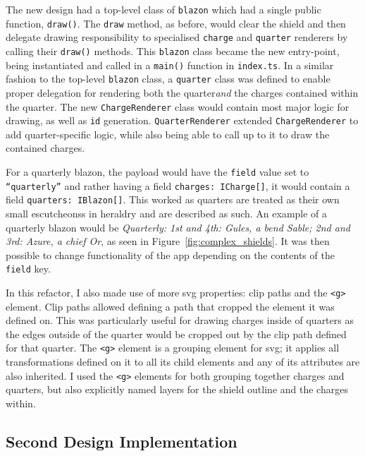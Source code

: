 \documentclass[nobib, a4paper, twoside, justified]{tufte-book}
\makeatletter
\newcommand{\svg}{\gls{svg}\@\xspace}
\newcommand{\charge}{\gls{charge}\@\xspace}
\newcommand{\charges}{\glspl{charge}\@\xspace}
\newcommand{\quarter}{\gls{quarter}\@\xspace}
\newcommand{\quarters}{\glspl{quarter}\@\xspace}
\newcommand{\blazon}{\gls{blazon}\@\xspace}
\newcommand{\ublazon}{\Gls{blazon}\@\xspace}
\newcommand{\payload}{\gls{payload}\@\xspace}
\makeatother
\begin{document}
The new design had a top-level class of \texttt{\ublazon} which had a single public function,
\texttt{draw()}. The \texttt{draw} method, as before, would clear the shield and then delegate
drawing responsibility to specialised \texttt{\charge{}} and \texttt{\quarter{}} renderers by
calling their \texttt{draw()} methods. This \texttt{\ublazon} class became the new entry-point,
being instantiated and called in a \texttt{main()} function in \texttt{index.ts}. In a similar
fashion to the top-level \texttt{\ublazon} class, a \texttt{\Gls{quarter}} class was defined to
enable proper delegation for rendering both the \quarter \textit{and} the \charges contained within
the quarter. The new \texttt{ChargeRenderer} class would contain most major logic for drawing, as
well as \texttt{id} generation. \texttt{QuarterRenderer} extended \texttt{ChargeRenderer} to add
\quarter-specific logic, while also being able to call up to it to draw the contained \charges.

For a quarterly \blazon, the \payload would have the \texttt{\gls{field}} value set to
\texttt{``quarterly''} and rather having a field \texttt{charges:~ICharge[]}, it would contain a
field \texttt{quarters:~IBlazon[]}. This worked as \quarters are treated as their own small
\glspl{escutcheons} in heraldry and are described as such. An example of a quarterly \blazon would
be \textit{Quarterly: 1st and 4th: Gules, a bend Sable; 2nd and 3rd: Azure, a chief Or}, as seen in
Figure~\ref{fig:complex_shields}. It was then possible to change functionality of the app depending
on the contents of the \texttt{field} key.

In this refactor, I also made use of more \svg properties: clip paths and the \texttt{<g>} element.
Clip paths allowed defining a path that cropped the element it was defined on. This was
particularly useful for drawing \charges inside of \quarters as the edges outside of the \quarter
would be cropped out by the clip path defined for that \quarter. The \texttt{<g>} element is a
grouping element for \svg; it applies all transformations defined on it to all its child elements
and any of its attributes are also inherited. I used the \texttt{<g>} elements for both grouping
together charges and quarters, but also explicitly named layers for the shield outline and the
\charges within.

\subsection{Second Design Implementation}%
\label{sub:second_design_implementation}
\end{document}
